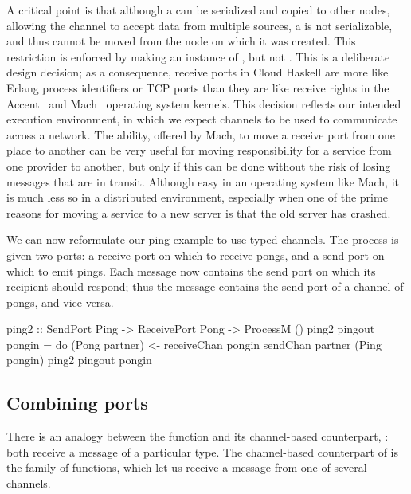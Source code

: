 \documentclass{sigplanconf}
\begin{document}
A critical point is that although a  can be serialized and copied to other nodes, allowing the channel to accept data from multiple sources, a  is not serializable, and thus cannot be moved from the node on which it was created.
This restriction is enforced by making  an instance of , but not . 
This is a deliberate design decision; as a consequence, receive ports in Cloud Haskell are more like Erlang process identifiers or TCP ports than they are like receive rights in the Accent~\cite{Rashid81} and Mach~\cite[\S4.2.3]{free-s2008} operating system kernels.   
This decision reflects our intended execution environment, in which we expect channels to be used to communicate across a network.  
The ability, offered by Mach, to move a receive port from one place to another can be very useful for moving responsibility for a service from one provider to another, but only if this can be done without the risk of losing messages that are in transit.  
Although easy in an operating system like Mach, it is much less so in a distributed environment, especially when one of the prime reasons for moving a service to a new server is that the old server has crashed.  

We can now reformulate our ping example to use typed channels. The  process is given two ports: a receive port on which to receive pongs, and a send port on which to emit pings. Each message now contains the send port on which its recipient should respond; thus the  message contains the send port of a channel of pongs, and vice-versa.
\begin{code}
ping2 :: SendPort Ping -> ReceivePort Pong -> ProcessM ()
ping2 pingout pongin = 
   do (Pong partner) <- receiveChan pongin
      sendChan partner (Ping pongin) 
      ping2 pingout pongin
\end{code}



\subsection{Combining ports}
There is an analogy between the  function and its channel-based counterpart, : both receive a message of a particular type. 
The channel-based counterpart of  is the  family of functions, which let us receive a message from one of several channels.
\end{document}
